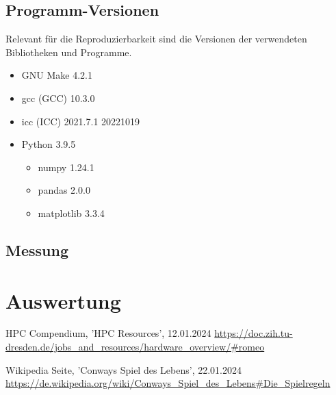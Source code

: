 \documentclass[plainarticle,zihtitle,german,final,hyperref,utf8]{zihpub}
\begin{document}
\subsection{Programm-Versionen}
Relevant für die Reproduzierbarkeit sind die Versionen der verwendeten Bibliotheken und Programme.
\begin{itemize}
	\item GNU Make 4.2.1
	\item gcc (GCC) 10.3.0
	\item icc (ICC) 2021.7.1 20221019
	\item Python 3.9.5
	\begin{itemize}
		\item numpy 1.24.1
		\item pandas 2.0.0
		\item matplotlib 3.3.4
	\end{itemize}
\end{itemize}

\subsection{Messung}

\section{Auswertung}


\newpage
\begin{thebibliography}{9}
	HPC Compendium, 'HPC Resources', 12.01.2024\newline
	\url{https://doc.zih.tu-dresden.de/jobs_and_resources/hardware_overview/#romeo}
	
	Wikipedia Seite, 'Conways Spiel des Lebens', 22.01.2024\newline
	\url{https://de.wikipedia.org/wiki/Conways_Spiel_des_Lebens#Die_Spielregeln}
\end{thebibliography}
\end{document}
